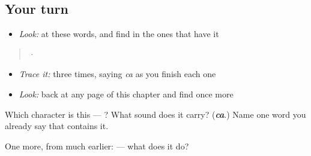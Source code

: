 \subsection*{Your turn}
\begin{itemize}
\raggedright
  \item \emph{Look:} at these words, and find  in the ones that have it
\end{itemize}

\begin{quote}
  ·  
\end{quote}

\begin{itemize}
\raggedright
  \item \emph{Trace it:}  three times, saying \emph{ca} as you finish each one
  \item \emph{Look:} back at any page of this chapter and find  once more
\end{itemize}

\begin{tcolorbox}[breakable,colback=teal!4,colframe=teal!35!black,title={Before you move on}]
Which character is this — ? What sound does it carry? (\emph{\textbf{ca}}.) Name one word you already say that contains it.

One more, from much earlier:  — what does it do?
\end{tcolorbox}

